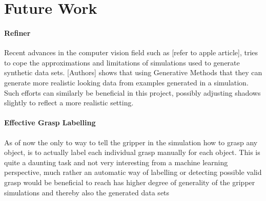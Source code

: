 \section{Future Work}

\paragraph{Refiner}
Recent advances in the computer vision field such as [refer to apple article], tries to cope the approximations and limitations of simulations used to generate synthetic data sets. [Authors] shows that using Generative Methods that they can generate more realistic looking data from examples generated in a simulation. Such efforts can similarly be beneficial in this project, possibly adjusting shadows slightly to reflect a more realistic setting. 

\paragraph{Effective Grasp Labelling}
As of now the only to way to tell the gripper in the simulation how to grasp any object, is to actually label each individual grasp manually for each object. This is quite a daunting task and not very interesting from a machine learning perspective, much rather an automatic way of labelling or detecting possible valid grasp would be beneficial to reach has higher degree of generality of the gripper simulations and thereby also the generated data sets